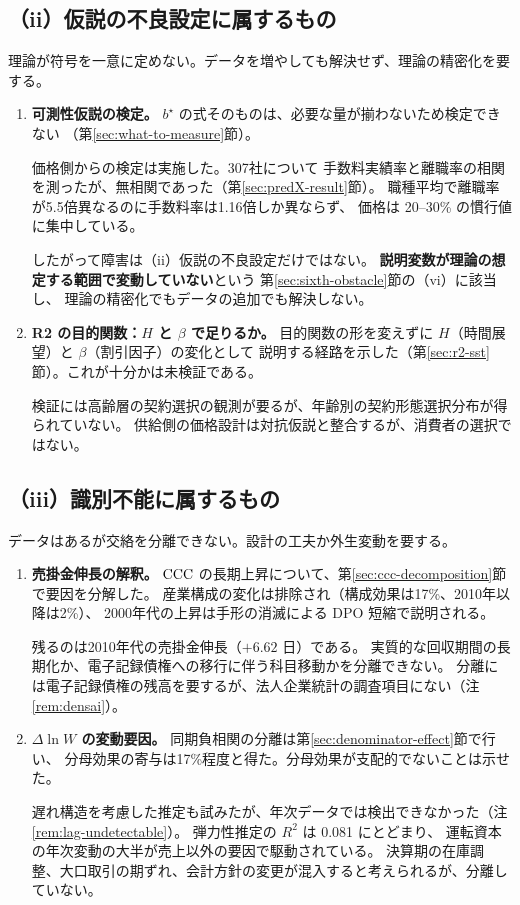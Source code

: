 \subsection{（ii）仮説の不良設定に属するもの}

理論が符号を一意に定めない。データを増やしても解決せず、理論の精密化を要する。

\begin{enumerate}[label=(\arabic*),start=2]
\item \textbf{可測性仮説の検定。}
$b^\star$ の式そのものは、必要な量が揃わないため検定できない
（第\ref{sec:what-to-measure}節）。

価格側からの検定は実施した。307社について
手数料実績率と離職率の相関を測ったが、無相関であった（第\ref{sec:predX-result}節）。
職種平均で離職率が5.5倍異なるのに手数料率は1.16倍しか異ならず、
価格は 20--30\% の慣行値に集中している。

したがって障害は（ii）仮説の不良設定だけではない。
\textbf{説明変数が理論の想定する範囲で変動していない}という
第\ref{sec:sixth-obstacle}節の（vi）に該当し、
理論の精密化でもデータの追加でも解決しない。

\item \textbf{R2 の目的関数：$H$ と $\beta$ で足りるか。}
目的関数の形を変えずに $H$（時間展望）と $\beta$（割引因子）の変化として
説明する経路を示した（第\ref{sec:r2-sst}節）。これが十分かは未検証である。

検証には高齢層の契約選択の観測が要るが、年齢別の契約形態選択分布が得られていない。
供給側の価格設計は対抗仮説と整合するが、消費者の選択ではない。
\end{enumerate}

\subsection{（iii）識別不能に属するもの}

データはあるが交絡を分離できない。設計の工夫か外生変動を要する。

\begin{enumerate}[label=(\arabic*),start=4]
\item \textbf{売掛金伸長の解釈。}
$\mathrm{CCC}$ の長期上昇について、第\ref{sec:ccc-decomposition}節で要因を分解した。
産業構成の変化は排除され（構成効果は17\%、2010年以降は2\%）、
2000年代の上昇は手形の消滅による DPO 短縮で説明される。

残るのは2010年代の売掛金伸長（$+6.62$ 日）である。
実質的な回収期間の長期化か、電子記録債権への移行に伴う科目移動かを分離できない。
分離には電子記録債権の残高を要するが、法人企業統計の調査項目にない（注\ref{rem:densai}）。

\item \textbf{$\Delta\ln W$ の変動要因。}
同期負相関の分離は第\ref{sec:denominator-effect}節で行い、
分母効果の寄与は17\%程度と得た。分母効果が支配的でないことは示せた。

遅れ構造を考慮した推定も試みたが、年次データでは検出できなかった（注\ref{rem:lag-undetectable}）。
弾力性推定の $R^2$ は 0.081 にとどまり、
運転資本の年次変動の大半が売上以外の要因で駆動されている。
決算期の在庫調整、大口取引の期ずれ、会計方針の変更が混入すると考えられるが、分離していない。
\end{enumerate}

